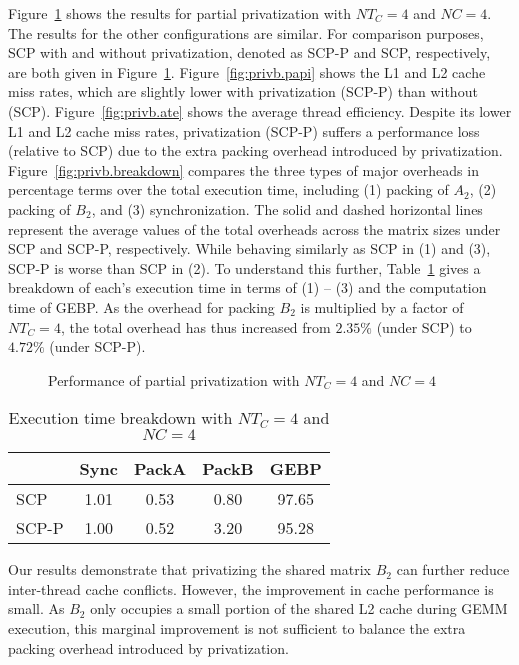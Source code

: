 Figure~\ref{fig:privb} shows the results for partial
privatization with $NT_C=4$ and $NC=4$.
The results for the other 
configurations are similar.
For comparison purposes,
SCP with and without privatization,
denoted as SCP-P and SCP, respectively,
are both given in Figure~\ref{fig:privb}.
Figure~\ref{fig:privb.papi} shows the L1 and L2
cache miss rates, which are 
slightly lower with privatization (SCP-P) than without
(SCP). Figure~\ref{fig:privb.ate} shows the average thread efficiency.
Despite its lower L1 and L2 cache miss rates,
privatization (SCP-P) suffers a performance loss
(relative to SCP) due to 
the extra packing overhead introduced by privatization.
Figure~\ref{fig:privb.breakdown} compares the
three types of major overheads in percentage terms 
over the total execution time, including
(1) packing of $A_2$, (2) packing of $B_2$,
and (3) synchronization.
The solid and dashed horizontal lines represent
the average values of the total overheads
across the matrix sizes
under SCP and SCP-P, respectively.
While behaving similarly as SCP
in (1) and (3), SCP-P is worse than SCP in (2).
To understand this further,
Table~\ref{tab:breakdown} gives a breakdown of each's
execution time in terms of (1) -- (3) and the
computation time of GEBP. As
the overhead for packing $B_2$
is multiplied by a factor of $NT_C=4$,
the total overhead has thus increased
from $2.35\%$ (under SCP) to $4.72\%$ (under SCP-P).

\begin{figure}
  \centering
  \caption{Performance of partial privatization with $NT_C=4$ and $NC=4$}
  \label{fig:privb}
\end{figure}

\begin{table}
  \centering
  \caption{Execution time breakdown with $NT_C=4$ and $NC=4$}
  \label{tab:breakdown}
  \setlength{\tabcolsep}{3.5pt}
  \begin{tabular}{lcccc}
    \toprule
     & Sync & PackA & PackB & GEBP\\
    \midrule
    SCP   & 1.01 & 0.53 & 0.80 & 97.65 \\
    SCP-P & 1.00 & 0.52 & 3.20 & 95.28\\
    \bottomrule
  \end{tabular}
\end{table}


Our results demonstrate that privatizing the shared matrix $B_2$ can further
reduce inter-thread cache conflicts.
However, the improvement in cache performance is small.
As $B_2$ only occupies a small portion of the shared L2 cache during GEMM execution,
this marginal improvement is not sufficient to
balance the extra packing overhead introduced
by privatization.
